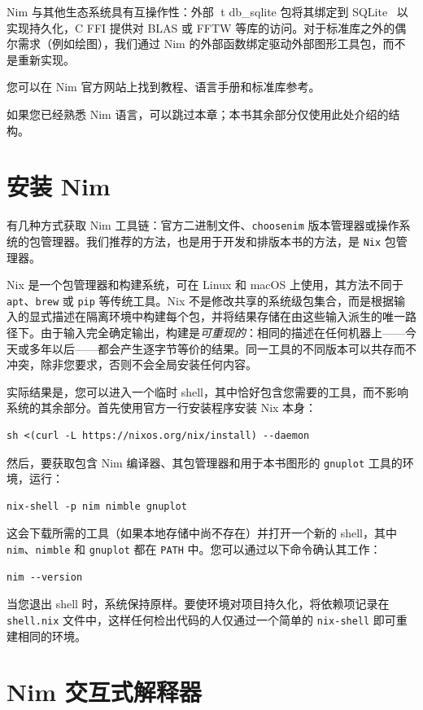 \documentclass[justified, sixbynine]{tufte-book}
\def\ft{\small\tt}
\theoremstyle{plain}%
\newtheorem * {corollary}{推论}
\theoremstyle{definition}
\theoremstyle{remark}
\newtheorem * {remark}{注记}
\newtheorem * {note}{注释}
\begin{document}
\begin{fullwidth}
Nim 与其他生态系统具有互操作性：外部 {t db\_sqlite} 包将其绑定到 SQLite~\cite{sqlite} 以实现持久化，C FFI 提供对 BLAS 或 FFTW 等库的访问。对于标准库之外的偶尔需求（例如绘图），我们通过 Nim 的外部函数绑定驱动外部图形工具包，而不是重新实现。

您可以在 Nim 官方网站上找到教程、语言手册和标准库参考。

如果您已经熟悉 Nim 语言，可以跳过本章；本书其余部分仅使用此处介绍的结构。

\goodbreak\section{安装 Nim}

有几种方式获取 Nim 工具链：官方二进制文件、{\ft choosenim} 版本管理器或操作系统的包管理器。我们推荐的方法，也是用于开发和排版本书的方法，是 {\ft Nix} 包管理器。

Nix 是一个包管理器和构建系统，可在 Linux 和 macOS 上使用，其方法不同于 {\ft apt}、{\ft brew} 或 {\ft pip} 等传统工具。Nix 不是修改共享的系统级包集合，而是根据输入的显式描述在隔离环境中构建每个包，并将结果存储在由这些输入派生的唯一路径下。由于输入完全确定输出，构建是\emph{可重现的}：相同的描述在任何机器上——今天或多年以后——都会产生逐字节等价的结果。同一工具的不同版本可以共存而不冲突，除非您要求，否则不会全局安装任何内容。

实际结果是，您可以进入一个临时 shell，其中恰好包含您需要的工具，而不影响系统的其余部分。首先使用官方一行安装程序安装 Nix 本身：
\begin{lstlisting}
sh <(curl -L https://nixos.org/nix/install) --daemon
\end{lstlisting}

然后，要获取包含 Nim 编译器、其包管理器和用于本书图形的 {\ft gnuplot} 工具的环境，运行：
\begin{lstlisting}
nix-shell -p nim nimble gnuplot
\end{lstlisting}

这会下载所需的工具（如果本地存储中尚不存在）并打开一个新的 shell，其中 {\ft nim}、{\ft nimble} 和 {\ft gnuplot} 都在 {\ft PATH} 中。您可以通过以下命令确认其工作：
\begin{lstlisting}
nim --version
\end{lstlisting}

当您退出 shell 时，系统保持原样。要使环境对项目持久化，将依赖项记录在 {\ft shell.nix} 文件中，这样任何检出代码的人仅通过一个简单的 {\ft nix-shell} 即可重建相同的环境。

\goodbreak\section{Nim 交互式解释器}


\end{fullwidth}
\end{document}
